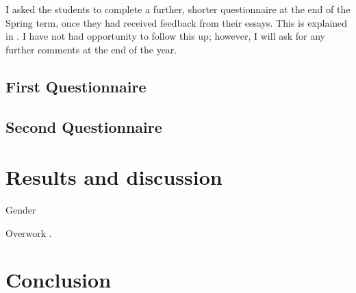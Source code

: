 I asked the students to complete a further, shorter questionnaire at the end of the Spring term, once they had received feedback from their essays. This is explained in . I have not had opportunity to follow this up; however, I will ask for any further comments at the end of the year.

\subsection{First Questionnaire}\label{sec:form1}

\subsection{Second Questionnaire}\label{sec:form2}

\section{Results and discussion}\label{sec:results}


Gender \citep{Gonsalves2014,Gonsalves2014a}

Overwork .

\section{Conclusion}\label{sec:student-conc}
